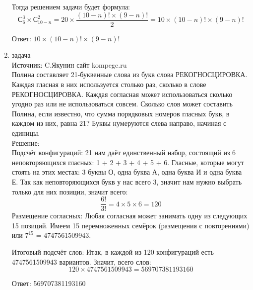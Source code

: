 \documentclass[a4paper,14pt]{extreport} %
\begin{document}
\begin{center}
\begin{enumerate}
						Тогда решением задачи будет формула:
								\begin{equation}
									С_6^3 \times С_{10-n}^2 = 20 \times \frac{(10-n)!\times(9-n)!}{2} = 10 \times {(10-n)!\times(9-n)!}
								\end{equation}
								
						Ответ: $10 \times {(10-n)!\times(9-n)!}$
						
						
						
						
						 \item {\large задача  }\\
						Источник: C.Якунин сайт kompege.ru\\
						\vspace{15pt}
						Полина составляет 21-буквенные слова из букв слова РЕКОГНОСЦИРОВКА. Каждая гласная в них используется столько раз, сколько в слове \\РЕКОГНОСЦИРОВКА. Каждая согласная может использоваться сколько угодно раз или не использоваться совсем. Сколько слов может составить Полина, если известно, что сумма порядковых номеров гласных букв, в каждом из них, равна 21? Буквы нумеруются слева направо, начиная с единицы.\\
						\vspace{15pt}
						Решение:\\
						Подсчёт конфигураций:
						21 нам даёт единственный набор, состоящий из 6 неповторяющихся гласных: 1 + 2 + 3 + 4 + 5 + 6. Гласные, которые могут стоять на этих местах: 3 буквы О, одна буква А, одна буква И и одна буква Е.  Так как неповторяющихся букв у нас всего 3, значит нам нужно выбрать только для них позиции, значит всего:
						\begin{equation}
						 \frac{6!}{3!} = 4 \times5 \times6 = 120 
						\end{equation}
						Размещение согласных:				
						Любая согласная может занимать одну из следующих 15 позиций. Имеем 15 перемноженных семёрок (размещения с повторениями) или $7^{15}$ = 4747561509943.
						
						\newpage						
						
						Итоговый подсчёт слов:
						Итак, в каждой из 120 конфигураций есть 4747561509943 вариантов. Значит, всего слов: 
						\begin{equation}
							120 \times 4747561509943 = 569707381193160 
						\end{equation}
						
						Ответ: 569707381193160
						

\end{enumerate}
\end{center}
\end{document}
